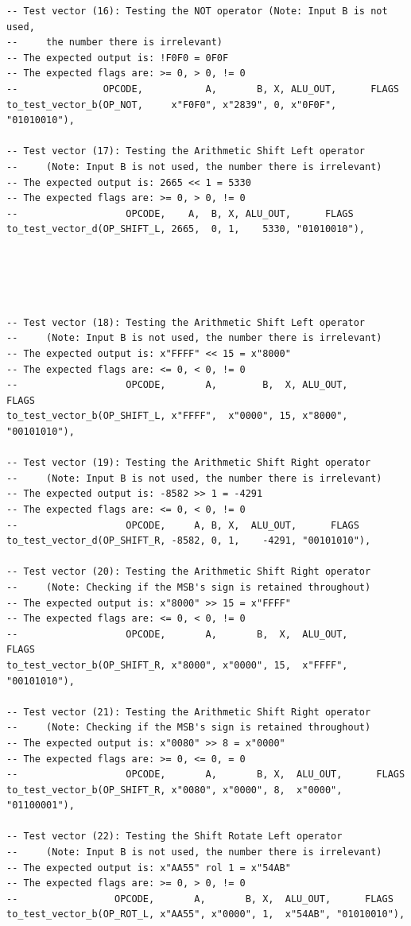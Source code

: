 \documentclass[10pt]{article}
\begin{document}
\begin{verbatim}
-- Test vector (16): Testing the NOT operator (Note: Input B is not used,
--     the number there is irrelevant) 
-- The expected output is: !F0F0 = 0F0F  
-- The expected flags are: >= 0, > 0, != 0
--               OPCODE,           A,       B, X, ALU_OUT,      FLAGS
to_test_vector_b(OP_NOT,     x"F0F0", x"2839", 0, x"0F0F", "01010010"),

-- Test vector (17): Testing the Arithmetic Shift Left operator 
--     (Note: Input B is not used, the number there is irrelevant)
-- The expected output is: 2665 << 1 = 5330 
-- The expected flags are: >= 0, > 0, != 0
--                   OPCODE,    A,  B, X, ALU_OUT,      FLAGS
to_test_vector_d(OP_SHIFT_L, 2665,  0, 1,    5330, "01010010"),





-- Test vector (18): Testing the Arithmetic Shift Left operator 
--     (Note: Input B is not used, the number there is irrelevant)
-- The expected output is: x"FFFF" << 15 = x"8000" 
-- The expected flags are: <= 0, < 0, != 0
--                   OPCODE,       A,        B,  X, ALU_OUT,      FLAGS
to_test_vector_b(OP_SHIFT_L, x"FFFF",  x"0000", 15, x"8000", "00101010"),

-- Test vector (19): Testing the Arithmetic Shift Right operator
--     (Note: Input B is not used, the number there is irrelevant) 
-- The expected output is: -8582 >> 1 = -4291
-- The expected flags are: <= 0, < 0, != 0
--                   OPCODE,     A, B, X,  ALU_OUT,      FLAGS    
to_test_vector_d(OP_SHIFT_R, -8582, 0, 1,    -4291, "00101010"),

-- Test vector (20): Testing the Arithmetic Shift Right operator
--     (Note: Checking if the MSB's sign is retained throughout)
-- The expected output is: x"8000" >> 15 = x"FFFF"
-- The expected flags are: <= 0, < 0, != 0
--                   OPCODE,       A,       B,  X,  ALU_OUT,      FLAGS    
to_test_vector_b(OP_SHIFT_R, x"8000", x"0000", 15,  x"FFFF", "00101010"),

-- Test vector (21): Testing the Arithmetic Shift Right operator
--     (Note: Checking if the MSB's sign is retained throughout) 
-- The expected output is: x"0080" >> 8 = x"0000"
-- The expected flags are: >= 0, <= 0, = 0
--                   OPCODE,       A,       B, X,  ALU_OUT,      FLAGS    
to_test_vector_b(OP_SHIFT_R, x"0080", x"0000", 8,  x"0000", "01100001"),

-- Test vector (22): Testing the Shift Rotate Left operator
--     (Note: Input B is not used, the number there is irrelevant)
-- The expected output is: x"AA55" rol 1 = x"54AB"
-- The expected flags are: >= 0, > 0, != 0
--                 OPCODE,       A,       B, X,  ALU_OUT,      FLAGS
to_test_vector_b(OP_ROT_L, x"AA55", x"0000", 1,  x"54AB", "01010010"),


\end{verbatim}
\end{document}
